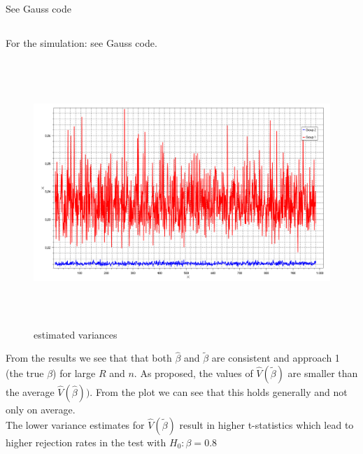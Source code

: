 \documentclass[11pt]{article}
\theoremstyle{break}
\begin{document}
\subsection{}
See Gauss code

\subsection{}
For the simulation: see Gauss code. \\
\begin{figure}[H]
\centering
\includegraphics[height=100mm]{variance_estimators.pdf}
\caption{estimated variances}
\end{figure}
From the results we see that that both $\hat{\beta}$ and $\tilde{\beta}$ are consistent and approach 1 (the true $\beta$) for large $R$ and $n$. As proposed, the values of $\hat{V}(\tilde{\beta})$ are smaller than the average $\hat{V}(\hat{\beta}))$. From the plot we can see that this holds generally and not only on average. \\
The lower variance estimates for $\hat{V}(\tilde{\beta})$ result in higher t-statistics which lead to higher rejection rates in the test with $H_0:\beta=0.8$
\end{document}
